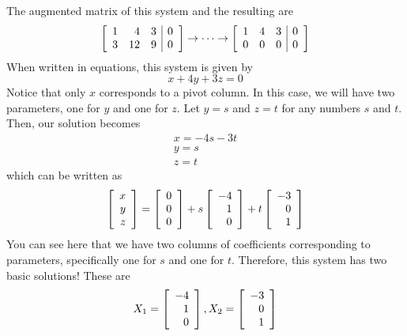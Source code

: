 \begin{solution}
The augmented matrix of this system and the resulting {\rref} are 
\begin{equation*}
\left[
\begin{array}{rrr|r}
1 & 4 & 3 & 0 \\
3 & 12 & 9 & 0
\end{array}
\right]
\rightarrow \cdots \rightarrow
\left[
\begin{array}{rrr|r}
1 & 4 & 3 & 0 \\
0 & 0 & 0 & 0
\end{array}
\right]
\end{equation*}
When written in equations, this system is given by 
\begin{equation*}
x + 4y +3z=0
\end{equation*}
Notice that only $x$ corresponds to a pivot column. In this case, we will have two parameters, 
one for $y$ and one for $z$. Let $y = s$ and $z=t$ for any numbers $s$ and $t$. Then, our solution becomes
\begin{equation*}
\begin{array}{c}
x = -4s - 3t \\
y = s \\
z = t
\end{array}
\end{equation*}
which can be written as 
\begin{equation*}
\left[
\begin{array}{r}
x\\
y\\
z
\end{array}
\right]
=
\left[
\begin{array}{r}
0\\
0\\
0
\end{array}
\right]
+
s
\left[
\begin{array}{r}
-4 \\
1 \\
0
\end{array}
\right]
+ 
t
\left[
\begin{array}{r}
-3 \\
0 \\
1
\end{array}
\right]
\end{equation*}
You can see here that we have two columns of coefficients corresponding to parameters, specifically one for $s$ and one for $t$. 
Therefore, this system has two basic solutions! These are
\begin{equation*}
X_1=
\left[
\begin{array}{r}
-4 \\
1 \\
0
\end{array}
\right], X_2 = \left[
\begin{array}{r}
-3 \\
0 \\
1
\end{array}
\right]
\end{equation*} 
\end{solution}

